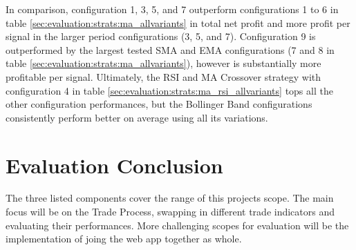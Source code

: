 In comparison, configuration 1, 3, 5, and 7 outperform configurations 1 to 6 in table \ref{sec:evaluation:strats:ma_allvariants} in total net profit and more profit per signal in the larger period configurations (3, 5, and 7). Configuration 9 is outperformed by the largest tested SMA and EMA configurations (7 and 8 in table \ref{sec:evaluation:strats:ma_allvariants}), however is substantially more profitable per signal. Ultimately, the RSI and MA Crossover strategy with configuration 4 in table \ref{sec:evaluation:strats:ma_rsi_allvariants} tops all the other configuration performances, but the Bollinger Band configurations consistently perform better on average using all its variations. 

\section{Evaluation Conclusion}
\label{sec:evaluation:review}

\noindent The three listed components cover the range of this projects scope. The main focus will be on the Trade Process, swapping in different trade indicators and evaluating their performances. More challenging scopes for evaluation will be the implementation of joing the web app together as whole.